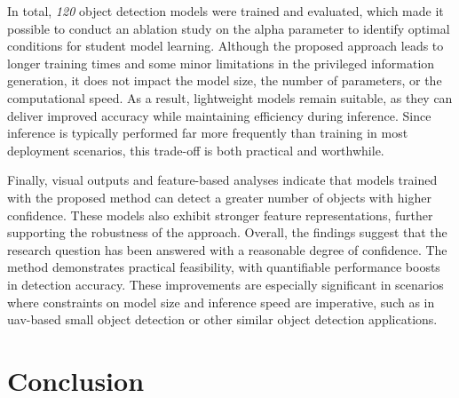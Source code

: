 In total, \textit{120} object detection models were trained and evaluated, which made it possible to conduct an ablation study on the \gls{alpha} parameter to identify optimal conditions for student model learning. Although the proposed approach leads to longer training times and some minor limitations in the privileged information generation, it does not impact the model size, the number of parameters, or the computational speed. As a result, lightweight models remain suitable, as they can deliver improved accuracy while maintaining efficiency during inference. Since inference is typically performed far more frequently than training in most deployment scenarios, this trade-off is both practical and worthwhile.

Finally, visual outputs and feature-based analyses indicate that models trained with the proposed method can detect a greater number of objects with higher confidence. These models also exhibit stronger feature representations, further supporting the robustness of the approach. Overall, the findings suggest that the research question has been answered with a reasonable degree of confidence. The method demonstrates practical feasibility, with quantifiable performance boosts in detection accuracy. These improvements are especially significant in scenarios where constraints on model size and inference speed are imperative, such as in \gls{uav}-based small object detection or other similar object detection applications.



\section{Conclusion}
\label{sec:5_conclusion}


